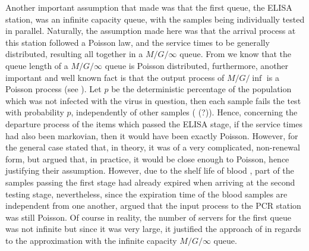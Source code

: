 \documentclass[11pt,a4paper]{article}
\begin{document}
\begin{spacing}{1.8}
 Another important assumption that \citet{BarLev2011} made was that the first queue, the ELISA station, was an infinite capacity queue, with the samples being individually tested in parallel. Naturally, the assumption made here was that the arrival process at this station followed a Poisson law, and the service times to be generally distributed, resulting all together in a \(M/G/\infty\) queue. From \citep{Tocher1963} we know that the queue length of a \(M/G/\infty\) queue is Poisson distributed, furthermore, another important and well known fact is that the output process of \(M/G/\inf\) is a Poisson process (see \citep{Kleinrock1976}). Let \(p\) be the deterministic percentage of the population which was not infected with the virus in question, then each sample fails the test with probability \(p\), independently of other samples (\citep{Bellhouse2001} (?)). Hence, concerning the departure process of the items which passed the ELISA stage, if  the service times had also been markovian, then it would have been exactly Poisson. However, for the general case \citet{BarLev2011} stated that, in theory, it was of a very complicated, non-renewal form, but argued that, in practice, it would be close enough to Poisson, hence justifying their assumption.  However, due to the shelf life of blood \citep{Wu2017}, part of the samples passing the first stage had already expired when arriving at the second testing stage, nevertheless, since the expiration time of the blood samples are independent from one another,  \citet{BarLev2011} argued that the input process to the PCR station was still Poisson. Of course in reality, the number of servers for the first queue was not infinite but since it was very large, it justified the approach of \citep{BarLev2011} in regards to the approximation with the infinite capacity \(M/G/\infty\) queue. 

\end{spacing}
\end{document}
